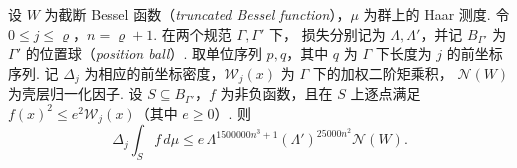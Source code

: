 \begin{lemma}[单个位置球上的相关积分]
\label{lem:b-position-ball}
\emitthmsource
设 $W$ 为截断 Bessel 函数（\emph{truncated Bessel function}），$\mu$ 为群上的 Haar 测度.
令 $0\le j\le\varrho$，$n=\varrho+1$. 在两个规范 $\Gamma,\Gamma'$ 下，
损失分别记为 $\Lambda,\Lambda'$，并记 $B_{\Gamma'}$ 为 $\Gamma'$ 的位置球（\emph{position ball}）.
取单位序列 $p,q$，其中 $q$ 为 $\Gamma$ 下长度为 $j$ 的前坐标序列.
记 $\Delta_j$ 为相应的前坐标密度，$\mathcal W_j(x)$ 为 $\Gamma$ 下的加权二阶矩乘积，
$\mathcal N(W)$ 为壳层归一化因子.
设 $S\subseteq B_{\Gamma'}$，$f$ 为非负函数，且在 $S$ 上逐点满足
$f(x)^2\le e^2\mathcal W_j(x)$（其中 $e\ge0$）. 则
\[
 \Delta_j\int_S f\,d\mu
 \le e\,\Lambda^{1500000 n^3+1}(\Lambda')^{25000 n^2}\mathcal N(W).
\]
\end{lemma}
